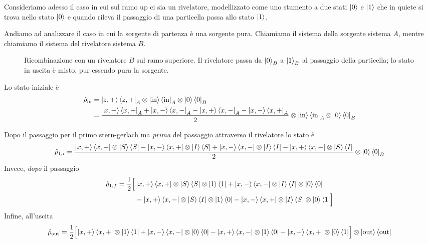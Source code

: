 Consideriamo adesso il caso in cui sul ramo up ci sia un rivelatore, modellizzato come uno stumento a due stati $\ket{0}$ e $\ket{1}$ che in quiete si trova nello stato $\ket{0}$ e quando rileva il passaggio di una particella passa allo stato $\ket{1}$. 

Andiamo ad analizzare il caso in cui la sorgente di partenza è una sorgente pura. Chiamiamo il sistema della sorgente sistema $A$, mentre chiamiamo il sistema del rivelatore sistema $B$. 

\begin{figure}[htbp]
\centering
{}
\caption{Ricombinazione con un rivelatore $B$ sul ramo superiore. Il
rivelatore passa da $\ket{0}_B$ a $\ket{1}_B$ al passaggio della
particella; lo stato in uscita è misto, pur essendo pura la sorgente.}
\label{fig:ricomb-rivelatore}
\end{figure}

Lo stato iniziale è 
\begin{align*}
    \hat{\rho}_{\text{in}} &= \ket{z,+}\bra{z,+}_A \otimes \ket{\text{in}}\bra{\text{in}}_A \otimes \ket{0}\bra{0}_B\\
    &= \frac{\ket{x,+}\bra{x,+}_A + \ket{x,-}\bra{x, -}_A - \ket{x, +}\bra{x, -}_A - \ket{x, -}\bra{x, +}_A}{2} \otimes \ket{\text{in}}\bra{\text{in}}_A \otimes \ket{0}\bra{0}_B
\end{align*}

Dopo il passaggio per il primo stern-gerlach ma \emph{prima} del passaggio attraverso il rivelatore lo stato è 
\begin{align*}
    \hat{\rho}_{1,i} = \frac{\ket{x, +}\bra{x, +} \otimes \ket{S}\bra{S} - \ket{x,-}\bra{x, +} \otimes \ket{I}\bra{S} + \ket{x, -}\bra{x, -} \otimes \ket{I}\bra{I} - \ket{x,+}\bra{x, -} \otimes \ket{S}\bra{I}}{2} \otimes \ket{0}\bra{0}_B
\end{align*}
Invece, \emph{dopo} il passaggio
\begin{align*}
    \hat{\rho}_{1,f} = \frac{1}{2} \Bigl[ &
      \ket{x,+}\bra{x,+} \otimes \ket{S}\bra{S} \otimes \ket{1}\bra{1}
    + \ket{x,-}\bra{x,-} \otimes \ket{I}\bra{I} \otimes \ket{0}\bra{0} \\
    &- \ket{x,+}\bra{x,-} \otimes \ket{S}\bra{I} \otimes \ket{1}\bra{0}
     - \ket{x,-}\bra{x,+} \otimes \ket{I}\bra{S} \otimes \ket{0}\bra{1}
    \Bigr]
\end{align*}
Infine, all'uscita 
\begin{equation*}
    \hat{\rho}_{\text{out}} = \frac{1}{2} \Bigl[\ket{x,+}\bra{x,+} \otimes \ket{1}\bra{1} + \ket{x,-}\bra{x,-} \otimes \ket{0}\bra{0} - \ket{x,+}\bra{x,-} \otimes \ket{1}\bra{0} - \ket{x,-}\bra{x,+} \otimes \ket{0}\bra{1}\Bigr] \otimes \ket{\text{out}}\bra{\text{out}}
\end{equation*}

